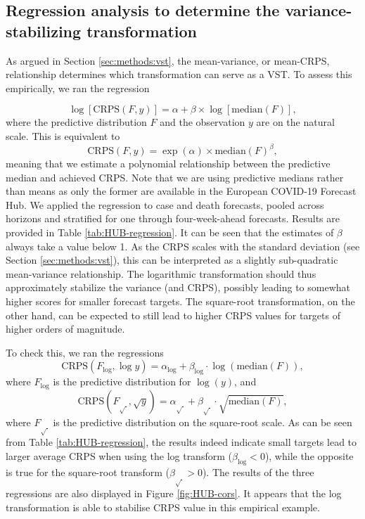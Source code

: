\documentclass{article}
\begin{document}
\subsection{Regression analysis to determine the variance-stabilizing transformation}

As argued in Section \ref{sec:methods:vst}, the mean-variance, or mean-CRPS, relationship determines which transformation can serve as a VST. To assess this empirically, we ran the regression

\begin{equation*}
    \log[\text{CRPS}(F, y)] = \alpha + \beta \times \log[\text{median}(F)], 
\end{equation*}
where the predictive distribution $F$ and the observation $y$ are on the natural scale. This is equivalent to
\begin{equation*}
    \text{CRPS}(F, y) = \exp(\alpha) \times \text{median}(F)^\beta, 
\end{equation*}
meaning that we estimate a polynomial relationship between the predictive median and achieved CRPS. Note that we are using predictive medians rather than means as only the former are available in the European COVID-19 Forecast Hub. We applied the regression to case and death forecasts, pooled across horizons and stratified for one through four-week-ahead forecasts. Results are provided in Table \ref{tab:HUB-regression}. It can be seen that the estimates of $\beta$ always take a value below 1.  As the CRPS scales with the standard deviation (see Section \ref{sec:methods:vst}), this can be interpreted as a slightly sub-quadratic mean-variance relationship. The logarithmic transformation should thus approximately stabilize the variance (and CRPS), possibly leading to somewhat higher scores for smaller forecast targets. The square-root transformation, on the other hand, can be expected to still lead to higher CRPS values for targets of higher orders of magnitude.

To check this, we ran the regressions
\begin{equation*}
    \text{CRPS}(F_{\log}, \log y) = \alpha_{\log} + \beta_{\log} \cdot \log{(\text{median}(F))},
\end{equation*}
where $F_{\log}$ is the predictive distribution for $\log(y)$, and
\begin{equation*}
    \text{CRPS}(F_{\sqrt{\ }}, \sqrt{y}) = \alpha_{\sqrt{\ }} + \beta_{\sqrt{\ }} \cdot \sqrt{\text{median}(F)},
\end{equation*} 
where $F_{\sqrt{\ }}$ is the predictive distribution on the square-root scale. As can be seen from Table \ref{tab:HUB-regression}, the results indeed indicate small targets lead to larger average CRPS when using the log transform ($\beta_{\log} < 0$), while the opposite is true for the square-root transform ($\beta_{\sqrt{\ }} > 0$). The results of the three regressions are also displayed in Figure \ref{fig:HUB-cors}. It appears that the log transformation is able to stabilise CRPS value in this empirical example. 
\end{document}
